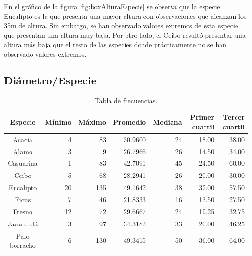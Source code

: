 \documentclass[11pt]{article}
\begin{document}
\begin{justify}
  En el gráfico de la figura \ref{fig:boxAlturaEspecie} se observa
  que la especie Eucalipto es la que presenta una mayor altura con observaciones
  que alcanzan los 35m de altura. Sin embargo, se han observado valores extremos
  de esta especie que presentan una altura muy baja. Por otro lado, el Ceibo
  resultó presentar una altura más baja que el resto de las especies donde
  prácticamente no se han observado valores extremos.
\end{justify}


\newpage
\subsection{Diámetro/Especie}

\begin{table}[h!]
  \begin{center}
    \begin{tabular}{| c | r | r | r | r | r | r |}
      \hline
      \textbf{Especie} & \textbf{Mínimo} & \textbf{Máximo} & \textbf{Promedio} &
      \textbf{Mediana} & \textbf{Primer cuartil} & \textbf{Tercer cuartil}  \\ \hline
      Acacia & 4 & 83 & 30.9600 & 24 & 18.00 & 38.00 \\ \hline
      Álamo & 3 & 9 & 	26.7966 & 26 & 14.50 & 34.00 \\ \hline
      Casuarina & 1 & 83 & 42.7091 & 45 & 24.50 & 60.00 \\ \hline
      Ceibo & 5 & 68 & 28.2941 & 26 & 20.00 & 30.00 \\ \hline
      Eucalipto & 20 & 135 & 49.1642 & 38 & 32.00 & 57.50 \\ \hline
      Ficus & 7 & 46 & 21.8333 & 16 & 13.50 & 27.50 \\ \hline
      Fresno & 12 & 72 & 29.6667 & 24 & 19.25 & 32.75 \\ \hline
      Jacarandá & 3 & 97 & 34.3182 & 33 & 20.00 & 46.25 \\ \hline
      Palo borracho & 6 & 130 & 49.3415 & 50 & 36.00 & 64.00 \\ \hline
    \end{tabular}
    \caption{Tabla de frecuencias.}
    \label{tab:tablaDiametroEspecie}
  \end{center}
\end{table}
\end{document}
